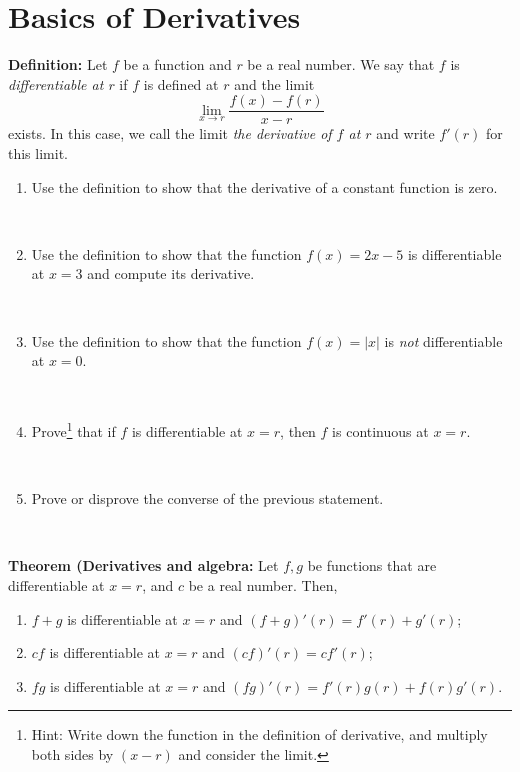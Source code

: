 \documentclass[12pt]{amsart}
\begin{document}
	
	\thispagestyle{empty}
	
	\section*{Basics of Derivatives}
	
\begin{framed} 
\noindent \textbf{Definition:} Let $f$ be a function and $r$ be a real number. We say that $f$ is \emph{differentiable at $r$} if $f$ is defined at $r$ and the limit
\[ \lim_{x\to r} \frac{ f(x) - f(r) }{x-r}\]
exists. In this case, we call the limit \emph{the derivative of $f$ at $r$} and write $f'(r)$ for this limit. 
 \end{framed}
 
 
 \begin{enumerate}
 \item Use the definition to show that the derivative of a constant function is zero.
 
 \
 
 \item Use the definition to show that the function $f(x) = 2x-5$ is differentiable at $x=3$ and compute its derivative. 
 
 \
 
 \item Use the definition to show that the function $f(x)=|x|$ is \emph{not} differentiable at $x=0$.
 
 \
 
 \item Prove\footnote{Hint: Write down the function in the definition of derivative, and multiply both sides by $(x-r)$ and consider the limit.} that if $f$ is differentiable at $x=r$, then $f$ is continuous at $x=r$. 
 
 \
 
 \item Prove or disprove the converse of the previous statement.
 \end{enumerate}
 
 \
 
 
 \begin{framed} 
 \noindent \textbf{Theorem (Derivatives and algebra:} Let $f,g$ be functions that are differentiable at $x=r$, and $c$ be a real number. Then,
 \begin{enumerate}
 \item $f+g$ is differentiable at $x=r$ and $(f+g)'(r) = f'(r) + g'(r)$;
 \item $cf$ is differentiable at $x=r$ and $(cf)'(r) = c f'(r)$;
 \item $fg$ is differentiable at $x=r$ and $(fg)'(r) = f'(r) g(r) + f(r) g'(r)$.
   \end{enumerate}
 \end{framed}
 
\end{document}

